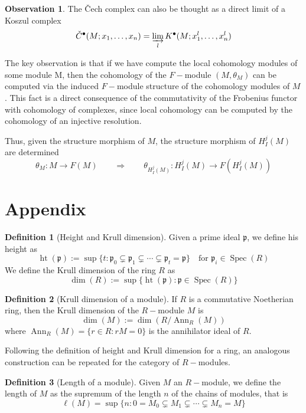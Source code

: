 \documentclass[leqno]{article}
\theoremstyle{definition}
\newtheorem{definition}{Definition}[section]
\newtheorem{observation}{Observation}[section]
\DeclareMathOperator{\heigth}{ht}
\DeclareMathOperator{\Spec}{Spec}
\DeclareMathOperator{\Ann}{Ann}
\begin{document}
\begin{observation}The \v{C}ech complex can also be thought as a direct limit of a Koszul complex
  \[
	\check{C}^{\bullet}(M; x_1, \ldots, x_n) = \varinjlim_{l} K^{\bullet}(M; x_1^l, \ldots, x_n^l)
  \] 
\end{observation}

The key observation is that if we have compute the local cohomology modules of some module M, then the cohomology of the $F-$module $(M, \theta_M)$ can be computed via the induced $F-$module structure of the cohomology modules of $M$. This fact is a direct consequence of the commutativity of the Frobenius functor with cohomology of complexes, since local cohomology can be computed by the cohomology of an injective resolution.

Thus, given the structure morphism of $M$, the structure morphism of $H_I^j(M)$ are determined
 \[
\theta_M : M \to F(M)  \qquad \Longrightarrow \qquad
\theta_{H_I^j (M)} : H_{I}^j(M) \to F(H_I^j(M))
\] 


\section{Appendix}

\begin{definition}[Height and Krull dimension] Given a prime ideal $\mathfrak{p}$, we define his height as
  \[
	\heigth (\mathfrak{p}) := \sup \{t: \mathfrak{p}_0 \subsetneq \mathfrak{p}_1 \subsetneq \cdots \subsetneq  \mathfrak{p}_t = \mathfrak{p} \} \quad \text{for } \mathfrak{p}_i\in \Spec(R)
  \]
We define the Krull dimension of the ring $R$ as
 \[
 \dim (R) :=  \sup \{\heigth (\mathfrak{p}) : \mathfrak{p}\in \Spec(R)\}
\] 
\end{definition}

\begin{definition}[Krull dimension of a module] If  $R$ is a commutative Noetherian ring, then the Krull dimension of the  $R-$module  $M$ is
   \[
\dim(M) := \dim (R / \Ann _R(M))
  \] 
  where $\Ann_R(M) = \{r \in R : rM = 0\}$ is the annihilator ideal of $R$.
\end{definition}

Following the definition of height and Krull dimension for a ring, an analogous construction can be repeated for the category of $R-$modules.

\begin{definition}[Length of a module] Given $M$ an $R-$module, we define the length of  $M$ as the supremum of the length $n$ of the chains of modules, that is
  \[
	\ell(M)= \sup \{n: 0 = M_0\subsetneq M_1 \subsetneq \cdots \subsetneq M_n = M\}
  \] 

\end{definition}
\end{document}
